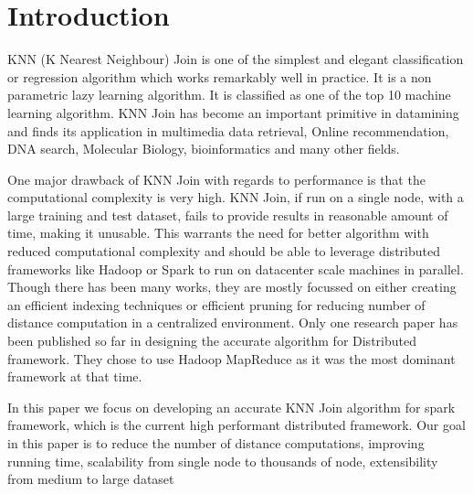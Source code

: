 \chapter{Introduction}


KNN (K Nearest Neighbour) Join is one of the simplest and elegant
classification or regression algorithm which works remarkably well in
practice. It is a non parametric lazy learning algorithm. It is
classified as one of the top 10 machine learning algorithm. KNN Join
has become an important primitive in datamining and
finds its application in multimedia data retrieval, Online
recommendation, DNA search,
Molecular Biology, bioinformatics  and
many other fields.

\medskip

One major drawback of KNN Join with regards to performance is that the computational complexity is
very high. KNN Join, if run on a single node, with a
large training and test dataset, fails to provide results in reasonable amount of time, making it
unusable. This warrants the need for better algorithm with
reduced computational complexity and should be able to
leverage distributed frameworks like Hadoop \cite{hadoop_mr} or Spark
\cite{apache_spark} to run on datacenter scale machines in parallel.
Though there has been many works, they are mostly focussed on either creating
an efficient indexing techniques or efficient pruning for reducing
number of distance computation in a centralized environment.
Only one
research paper \cite{lu_efficient_2012} has been published so far in
designing the accurate algorithm
for Distributed framework. They chose to use Hadoop MapReduce as it
was the most dominant framework at that time.


In this paper we focus on
developing an accurate KNN Join algorithm for spark framework, which is
the current high performant distributed framework. Our goal in this
paper is to reduce the number of distance computations, improving running time,
scalability from single node to thousands of node, extensibility from
medium to large dataset

